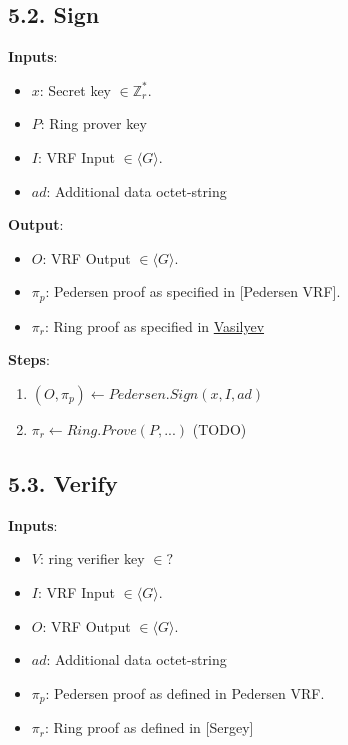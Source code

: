 \documentclass[
]{article}
\providecommand{\tightlist}{%
  \setlength{\itemsep}{0pt}\setlength{\parskip}{0pt}}
\begin{document}
\hypertarget{sign-2}{%
\subsection{5.2. Sign}\label{sign-2}}

\textbf{Inputs}:

\begin{itemize}
\tightlist
\item
  \(x\): Secret key \(\in \mathbb{Z}^*_r\).
\item
  \(P\): Ring prover key
\item
  \(I\): VRF Input \(\in \langle G \rangle\).
\item
  \(ad\): Additional data octet-string
\end{itemize}

\textbf{Output}:

\begin{itemize}
\tightlist
\item
  \(O\): VRF Output \(\in \langle G \rangle\).
\item
  \(\pi_p\): Pedersen proof as specified in {[}Pedersen VRF{]}.
\item
  \(\pi_r\): Ring proof as specified in
  \href{https://hackmd.io/ulW5nFFpTwClHsD0kusJAA}{Vasilyev}
\end{itemize}

\textbf{Steps}:

\begin{enumerate}
\def\labelenumi{\arabic{enumi}.}
\tightlist
\item
  \((O, \pi_p) \leftarrow Pedersen.Sign(x, I, ad)\)
\item
  \(\pi_r \leftarrow Ring.Prove(P, ...)\) (TODO)
\end{enumerate}

\hypertarget{verify-2}{%
\subsection{5.3. Verify}\label{verify-2}}

\textbf{Inputs}:

\begin{itemize}
\tightlist
\item
  \(V\): ring verifier key \(\in ?\)
\item
  \(I\): VRF Input \(\in \langle G \rangle\).
\item
  \(O\): VRF Output \(\in \langle G \rangle\).
\item
  \(ad\): Additional data octet-string
\item
  \(\pi_p\): Pedersen proof as defined in Pedersen VRF.
\item
  \(\pi_r\): Ring proof as defined in {[}Sergey{]}
\end{itemize}
\end{document}
